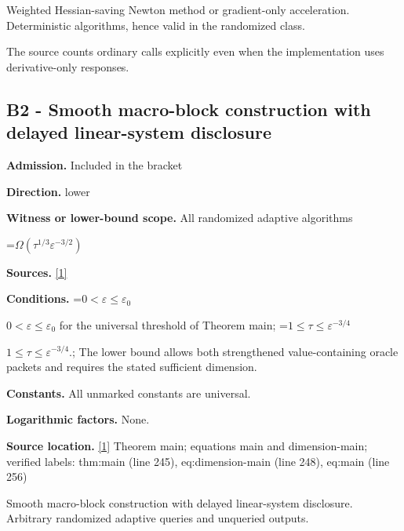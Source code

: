 \documentclass[10pt,a4paper]{article}
\newcommand{\AtlasMath}[1]{\par\begingroup\centering\setbox0=\hbox{$\displaystyle #1$}\ifdim\wd0>1.4\linewidth\typeout{ATLAS WIDE FORMULA: \the\wd0}\fi\ifdim\wd0>\linewidth\resizebox{\linewidth}{!}{\box0}\else\box0\fi\par\endgroup}
\newcommand{\AtlasInlineMath}[1]{\begingroup\setbox0=\hbox{$#1$}\ifdim\wd0>.4\linewidth\endgroup\AtlasMath{#1}\else\endgroup$#1$\fi}
\begin{document}
Weighted Hessian-saving Newton method or gradient-only acceleration. Deterministic algorithms, hence valid in the randomized class.



The source counts ordinary calls explicitly even when the implementation uses derivative-only responses.



\subsection{B2 - Smooth macro-block construction with delayed linear-system disclosure}


\textbf{Admission.} Included in the bracket



\textbf{Direction.} lower



\textbf{Witness or lower-bound scope.} All randomized adaptive algorithms



\AtlasMath{\Omega(\tau^{1/3}\varepsilon^{-3/2})}


\textbf{Sources.} \href{https://github.com/WU-Wendao/Colombo/blob/main/colombo_sensorium/Complexity_altas/data/sources/colombo/A4/manuscript.pdf}{[1]}



\textbf{Conditions.} \AtlasInlineMath{0<\varepsilon\le\varepsilon_0} for the universal threshold of Theorem main; \AtlasInlineMath{1\le\tau\le\varepsilon^{-3/4}}.; The lower bound allows both strengthened value-containing oracle packets and requires the stated sufficient dimension.



\textbf{Constants.} All unmarked constants are universal.



\textbf{Logarithmic factors.} None.



\textbf{Source location.} \href{https://github.com/WU-Wendao/Colombo/blob/main/colombo_sensorium/Complexity_altas/data/sources/colombo/A4/manuscript.pdf}{[1]} Theorem main; equations main and dimension-main; verified labels: thm:main (line 245), eq:dimension-main (line 248), eq:main (line 256)



Smooth macro-block construction with delayed linear-system disclosure. Arbitrary randomized adaptive queries and unqueried outputs.
\end{document}
